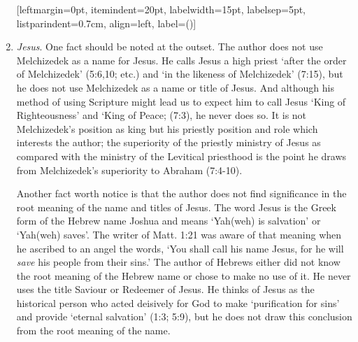 \begin{enumerate}[leftmargin=0pt,
                  itemindent=20pt,
                  labelwidth=15pt,
                  labelsep=5pt,
                  listparindent=0.7cm,
                  align=left,
                  label=(\roman*)]
    \item {\it Jesus}. One fact should be noted at the outset.
          The author does not use Melchizedek as a name for Jesus.
          He calls Jesus a high priest `after the order of Melchizedek' (5:6,10;
          etc.) and `in the likeness of Melchizedek' (7:15), but he does not use
          Melchizedek as a name or title of Jesus.
          And although his method of using Scripture might lead us to expect him
          to call Jesus `King of Righteousness' and `King of Peace; (7:3), he
          never does so.
          It is not Melchizedek's position as king but his priestly position and
          role which interests the author; the superiority of the priestly
          ministry of Jesus as compared with the ministry of the Levitical
          priesthood is the point he draws from Melchizedek's superiority to
          Abraham (7:4-10).
          \newline

          Another fact worth notice is that the author does not find
          significance in the root meaning of the name and titles of Jesus.
          The word Jesus is the Greek form of the Hebrew name Joshua and means
          `Yah(weh) is salvation' or `Yah(weh) saves'.
          The writer of Matt. 1:21 was aware of that meaning when he ascribed to
          an angel the words, `You shall call his name Jesus, for he will {\it
          save} his people from their sins.'
          The author of Hebrews either did not know the root meaning of the
          Hebrew name or chose to make no use of it.
          He never uses the title Saviour or Redeemer of Jesus.
          He thinks of Jesus as the historical person who acted deisively for
          God to make `purification for sins' and provide `eternal salvation'
          (1:3; 5:9), but he does not draw this conclusion from the root meaning
          of the name.
          \newline


\end{enumerate}
